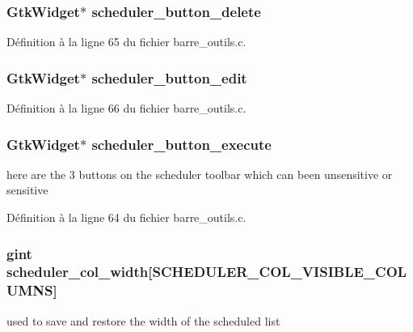\subsubsection[{scheduler\_\-button\_\-delete}]{\setlength{\rightskip}{0pt plus 5cm}GtkWidget$\ast$ {\bf scheduler\_\-button\_\-delete}}\label{gsb__scheduler__list_8c_a3eb48f27c4c4fe376efa3cbccab64398}


Définition à la ligne 65 du fichier barre\_\-outils.c.

\subsubsection[{scheduler\_\-button\_\-edit}]{\setlength{\rightskip}{0pt plus 5cm}GtkWidget$\ast$ {\bf scheduler\_\-button\_\-edit}}\label{gsb__scheduler__list_8c_aee9c73717e42febf99a7eb6a09521f3a}


Définition à la ligne 66 du fichier barre\_\-outils.c.

\subsubsection[{scheduler\_\-button\_\-execute}]{\setlength{\rightskip}{0pt plus 5cm}GtkWidget$\ast$ {\bf scheduler\_\-button\_\-execute}}\label{gsb__scheduler__list_8c_a1333bf48291dd195210eda922d5183c4}
here are the 3 buttons on the scheduler toolbar which can been unsensitive or sensitive 

Définition à la ligne 64 du fichier barre\_\-outils.c.

\subsubsection[{scheduler\_\-col\_\-width}]{\setlength{\rightskip}{0pt plus 5cm}gint {\bf scheduler\_\-col\_\-width}[SCHEDULER\_\-COL\_\-VISIBLE\_\-COLUMNS]}\label{gsb__scheduler__list_8c_a8278ca506ea616623cd8cdc764188ee9}
used to save and restore the width of the scheduled list 

